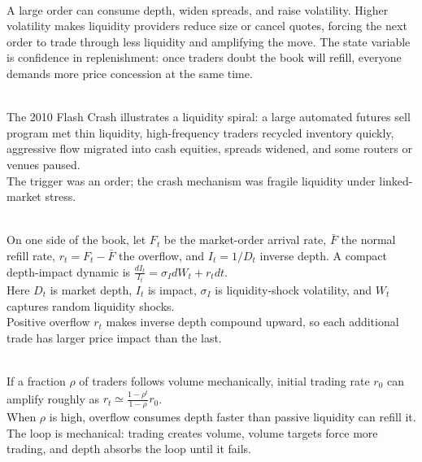 \begin{mechanism} \\
A large order can consume depth, widen spreads, and raise volatility. Higher volatility makes liquidity providers reduce size or cancel quotes, forcing the next order to trade through less liquidity and amplifying the move. The state variable is confidence in replenishment: once traders doubt the book will refill, everyone demands more price concession at the same time.
\end{mechanism}
\begin{casestudy} \\
The 2010 Flash Crash illustrates a liquidity spiral: a large automated futures sell program met thin liquidity, high-frequency traders recycled inventory quickly, aggressive flow migrated into cash equities, spreads widened, and some routers or venues paused.\\
The trigger was an order; the crash mechanism was fragile liquidity under linked-market stress.
\end{casestudy}
\begin{model} \\
On one side of the book, let $F_t$ be the market-order arrival rate, $\bar{F}$ the normal refill rate, $r_t=F_t-\bar{F}$ the overflow, and $I_t=1/D_t$ inverse depth. A compact depth-impact dynamic is $\frac{dI_t}{I_t}=\sigma_I dW_t+r_tdt$.\\
Here $D_t$ is market depth, $I_t$ is impact, $\sigma_I$ is liquidity-shock volatility, and $W_t$ captures random liquidity shocks.\\
Positive overflow $r_t$ makes inverse depth compound upward, so each additional trade has larger price impact than the last.
\end{model}
\begin{mechanism} \\
If a fraction $\rho$ of traders follows volume mechanically, initial trading rate $r_0$ can amplify roughly as $r_t\simeq \frac{1-\rho^t}{1-\rho}r_0$.\\
When $\rho$ is high, overflow consumes depth faster than passive liquidity can refill it. The loop is mechanical: trading creates volume, volume targets force more trading, and depth absorbs the loop until it fails.
\end{mechanism}
